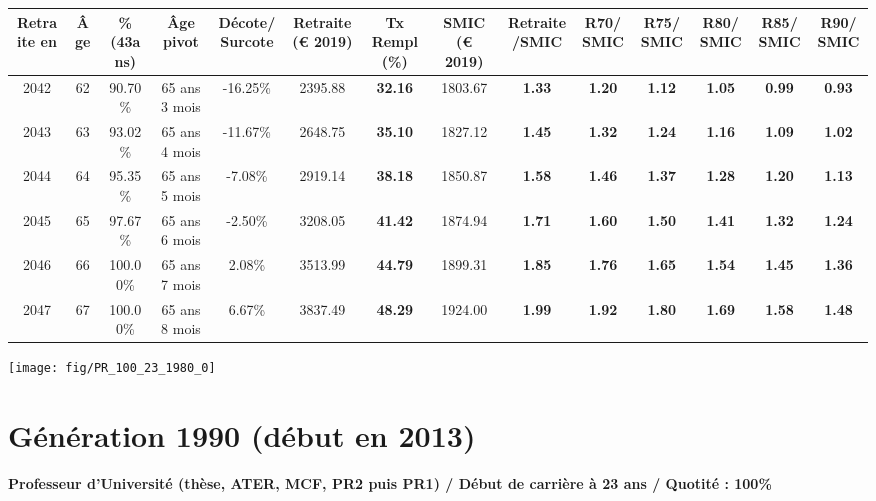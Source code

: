 \begin{adjustbox}{max width=\textwidth} 
\begin{tabular}[htb]{|c|c||c|c|c||c|c||c|c||c|c|c|c|c|} 
\hline 
 Retraite en &  Âge &  \%(43ans) &  Âge pivot &  Décote/Surcote &  Retraite (\euro{} 2019) &  Tx Rempl(\%) &  SMIC (\euro{} 2019) &  Retraite/SMIC &  R70/SMIC &  R75/SMIC &  R80/SMIC &  R85/SMIC &  R90/SMIC \\ 
\hline \hline 
 2042 &  62 &  90.70\% &  65 ans 3 mois &  -16.25\% &  2395.88 &  {\bf 32.16} &  1803.67 &  {\bf 1.33} &  {\bf 1.20} &  {\bf 1.12} &  {\bf 1.05} &  {\bf {\color{red} 0.99}} &  {\bf {\color{red} 0.93}} \\ 
\hline 
 2043 &  63 &  93.02\% &  65 ans 4 mois &  -11.67\% &  2648.75 &  {\bf 35.10} &  1827.12 &  {\bf 1.45} &  {\bf 1.32} &  {\bf 1.24} &  {\bf 1.16} &  {\bf 1.09} &  {\bf 1.02} \\ 
\hline 
 2044 &  64 &  95.35\% &  65 ans 5 mois &  -7.08\% &  2919.14 &  {\bf 38.18} &  1850.87 &  {\bf 1.58} &  {\bf 1.46} &  {\bf 1.37} &  {\bf 1.28} &  {\bf 1.20} &  {\bf 1.13} \\ 
\hline 
 2045 &  65 &  97.67\% &  65 ans 6 mois &  -2.50\% &  3208.05 &  {\bf 41.42} &  1874.94 &  {\bf 1.71} &  {\bf 1.60} &  {\bf 1.50} &  {\bf 1.41} &  {\bf 1.32} &  {\bf 1.24} \\ 
\hline 
 2046 &  66 &  100.00\% &  65 ans 7 mois &  2.08\% &  3513.99 &  {\bf 44.79} &  1899.31 &  {\bf 1.85} &  {\bf 1.76} &  {\bf 1.65} &  {\bf 1.54} &  {\bf 1.45} &  {\bf 1.36} \\ 
\hline 
 2047 &  67 &  100.00\% &  65 ans 8 mois &  6.67\% &  3837.49 &  {\bf 48.29} &  1924.00 &  {\bf 1.99} &  {\bf 1.92} &  {\bf 1.80} &  {\bf 1.69} &  {\bf 1.58} &  {\bf 1.48} \\ 
\hline 
\hline 
\end{tabular} 
\end{adjustbox} 
 
 \vspace{0.1cm} 

 {\hspace{-2.2cm}\texttt{[image: fig/PR\_100\_23\_1980\_0]}} 

\newpage 
 
\section{Génération 1990 (début en 2013)\label{PR_100_23_1990_0}} 
 
{\bf \noindent Professeur d'Université (thèse, ATER, MCF, PR2 puis PR1) / Début de carrière à 23 ans / Quotité : 100\%}  ~ 

